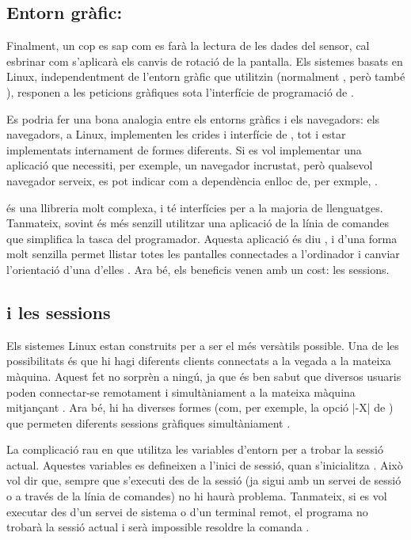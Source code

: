 \subsection{Entorn gràfic: }

Finalment, un cop es sap com es farà la lectura de les dades del sensor, cal
esbrinar com s'aplicarà els canvis de rotació de la pantalla. Els sistemes
basats en Linux, independentment de l'entorn gràfic que utilitzin (normalment
, però també ), responen a les peticions gràfiques sota
l'interfície de programació de  \cite{Xlib}.

Es podria fer una bona analogia entre
els entorns gràfics i els navegadors: els navegadors, a Linux, implementen les
crides i interfície de , tot i estar implementats internament
de formes diferents. Si es vol implementar una aplicació que necessiti, per
exemple, un navegador incrustat, però qualsevol navegador serveix, es pot
indicar com a dependència  enlloc de, per exmple, .

 és una llibreria molt complexa, i té interfícies per a la majoria
de llenguatges. Tanmateix, sovint és més senzill utilitzar una aplicació de
la línia de comandes que simplifica la tasca del programador. Aquesta
aplicació és diu , i d'una forma molt senzilla permet llistar
totes les pantalles connectades a l'ordinador i canviar l'orientació
d'una d'elles \cite{Xrandr}. Ara bé, els beneficis venen amb un cost: les sessions.

\subsection{ i les sessions}
\label{subsec:xrandr}

Els sistemes Linux estan construits per a ser el més versàtils possible. Una
de les possibilitats és que hi hagi diferents clients connectats a la vegada
a la mateixa màquina. Aquest fet no sorprèn a ningú, ja que és ben sabut que
diversos usuaris poden connectar-se remotament i simultàniament a la mateixa
màquina mitjançant . Ara bé, hi ha diverses formes (com, per exemple,
la opció \ord|-X| de ) que permeten diferents sessions gràfiques
simultàniament \cite{ManSSH}.

La complicació rau en que  utilitza les variables d'entorn per a
trobar la sessió actual. Aquestes variables es defineixen a l'inici de sessió,
quan s'inicialitza . Això vol dir que, sempre que s'executi
 des de la sessió (ja sigui amb un servei de sessió o a través de
la línia de comandes) no hi haurà problema.
Tanmateix, si es vol executar  des d'un servei de sistema o d'un
terminal remot, el programa no trobarà la sessió actual i serà impossible
resoldre la comanda \cite{ArchWiki}.

